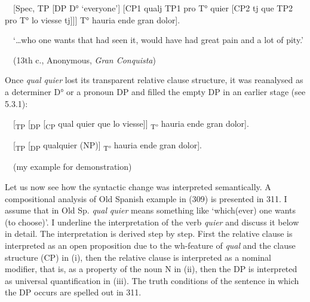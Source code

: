 \begin{styleListParagraph}
\textmd{\ \ [Spec, TP [DP D° ‘everyone’] [CP1 qualj TP1 pro T° quier [CP2 tj que TP2 pro T° lo viesse tj]]] T° hauria ende gran dolor].}
\end{styleListParagraph}

\begin{styleStandard}
\ \ ‘…who one wants that had seen it, would have had great pain and a lot of pity.’
\end{styleStandard}

\begin{styleListParagraph}
\textmd{\ \ (13th c.,}\textmd{\textit{ }}\textmd{Anonymous, }\textmd{\textit{Gran Conquista}}\textmd{)}
\end{styleListParagraph}

\begin{styleStandard}
Once \textit{qual quier} lost its transparent relative clause structure, it was reanalysed as a determiner D° or a pronoun DP and filled the empty DP in an earlier stage (see 5.3.1):
\end{styleStandard}

\begin{styleAuthor}
\ \ [\textsubscript{TP} [\textsubscript{DP} [\textsubscript{CP} qual quier que lo viesse]] \textsubscript{T° }hauria ende gran dolor]. 
\end{styleAuthor}

\begin{styleAuthor}
\ \ [\textsubscript{TP} [\textsubscript{DP} qualquier (NP)] \textsubscript{T° }hauria ende gran dolor]. 
\end{styleAuthor}

\begin{styleListParagraph}
\textmd{\ \ (my example for demonstration)}
\end{styleListParagraph}

\begin{styleStandard}
Let us now see how the syntactic change was interpreted semantically. A compositional analysis of Old Spanish example in (309) is presented in 311. I assume that in Old Sp. \textit{qual} \textit{quier} means something like ‘which(ever) one wants (to choose)’. I underline the interpretation of the verb \textit{quier} and discuss it below in detail. The interpretation is derived step by step. First the relative clause is interpreted as an open proposition due to the wh-feature of \textit{qual} and the clause structure (CP) in (i), then the relative clause is interpreted as a nominal modifier, that is, as a property of the noun N in (ii), then the DP is interpreted as universal quantification in (iii). The truth conditions of the sentence in which the DP occurs are spelled out in 311.
\end{styleStandard}


